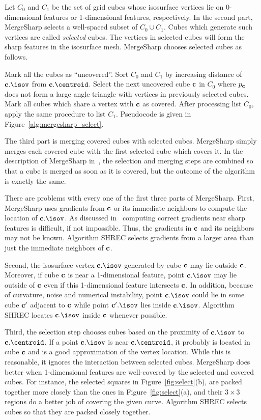 Let $C_0$ and $C_1$ be the set of grid cubes whose isosurface vertices
lie on 0-dimensional features or 1-dimensional features, respectively.
In the second part, MergeSharp selects a well-spaced subset 
of $C_0 \cup C_1$.
Cubes which generate such vertices are called {\em selected} cubes.
The vertices in selected cubes will form the sharp features
in the isosurface mesh.
MergeSharp chooses selected cubes as follows.

Mark all the cubes as ``uncovered''.
Sort $C_0$ and $C_1$ by increasing distance
of $\cb.\isov$ from $\cb.\centroid$.
Select the next uncovered cube $\mathbf{c}$ in $C_0$
where $p_{\mathbf{c}}$ does not form a large angle triangle 
with vertices in previously selected cubes.
Mark all cubes which share a vertex with $\mathbf{c}$ as covered.
After processing list $C_0$, apply the same procedure to list $C_1$.
Pseudocode is given in Figure~\ref{alg:mergesharp_select}.

The third part is merging covered cubes with selected cubes.
MergeSharp simply merges each covered cube with the first selected cube
which covers it.
In the description of MergeSharp in~\cite{bw-cisec-13}, 
the selection and merging steps are combined
so that a cube is merged as soon as it is covered,
but the outcome of the algorithm is exactly the same.

There are problems with every one of the first three parts of MergeSharp.
First, MergeSharp uses gradients from $\mathbf{c}$ or its immediate neighbors
to compute the location of $\cb.\isov$.
As discussed in~\cite{bw-crgsd-15}
computing correct gradients near sharp features is difficult,
if not impossible.
Thus, the gradients in $\mathbf{c}$ and its neighbors may not be known.
Algorithm SHREC selects gradients from a larger area
than just the immediate neighbors of $\mathbf{c}$.

Second, the isosurface vertex $\cb.\isov$ generated by cube $\mathbf{c}$
may lie outside $\mathbf{c}$.
Moreover, if cube $\mathbf{c}$ is near a 1-dimensional feature,
point $\cb.\isov$ may lie outside of $\mathbf{c}$
even if this 1-dimensional feature intersects $\mathbf{c}$.
In addition, because of curvature, noise and numerical instability,
point $\cb.\isov$ could lie in some cube $\mathbf{c}'$ adjacent to $\mathbf{c}$
while point $\cb'.\isov$ lies inside $\cb.\isov$.
Algorithm SHREC locates $\cb.\isov$ inside $\mathbf{c}$ whenever possible.

Third, the selection step chooses cubes based on the proximity
of $\cb.\isov$ to $\cb.\centroid$.
If a point $\cb.\isov$ is near $\cb.\centroid$,
it probably is located in cube $\mathbf{c}$ 
and is a good approximation of the vertex location.
While this is reasonable,
it ignores the interaction between selected cubes.
MergeSharp does better when 1-dimensional features are well-covered 
by the selected and covered cubes.
For instance, 
the selected squares in Figure~\ref{fig:select}(b), 
are packed together more closely
than the ones in Figure~\ref{fig:select}(a), 
and their $3 \times 3$ regions do a better job of covering
the given curve.
Algorithm SHREC selects cubes so that they are packed closely together.


